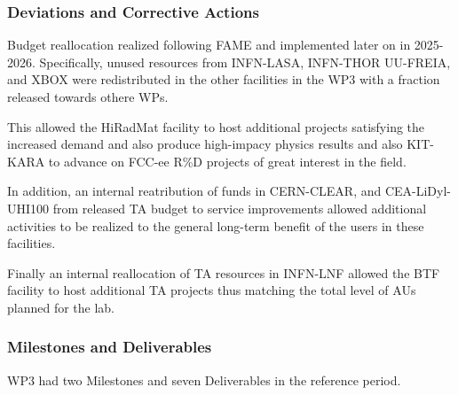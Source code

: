 \subsubsection*{Deviations and Corrective Actions}
\label{sec:wp3_deviations}

Budget reallocation realized following FAME and implemented later on in 2025-2026. Specifically, unused resources from INFN-LASA, INFN-THOR UU-FREIA, and XBOX were redistributed in the other facilities in the WP3 with a fraction released towards othere WPs. 

This allowed the HiRadMat facility to host additional projects satisfying the increased demand and also produce high-impacy physics results and also KIT-KARA to advance on FCC-ee R\%D projects of great interest in the field. 

In addition, an internal reatribution of funds in CERN-CLEAR, and CEA-LiDyl-UHI100 from released TA budget to service improvements allowed additional activities to be realized to the general long-term benefit of the users in these facilities. 

Finally an internal reallocation of TA resources in INFN-LNF allowed the BTF facility to host additional TA projects thus matching the total level of AUs planned for the lab. 

\subsubsection*{Milestones and Deliverables}

WP3 had two Milestones and seven Deliverables in the reference period. 


